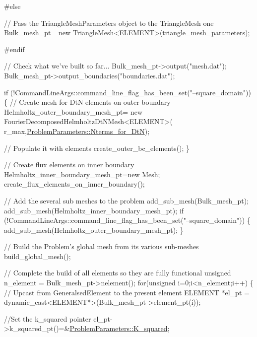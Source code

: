 \begin{DoxyCodeInclude}
\textcolor{preprocessor}{#else}

 \textcolor{comment}{// Pass the TriangleMeshParameters object to the TriangleMesh one}
 Bulk\_mesh\_pt= \textcolor{keyword}{new} TriangleMesh<ELEMENT>(triangle\_mesh\_parameters);

\textcolor{preprocessor}{#endif}

 \textcolor{comment}{// Check what we've built so far...}
 Bulk\_mesh\_pt->output(\textcolor{stringliteral}{"mesh.dat"});
 Bulk\_mesh\_pt->output\_boundaries(\textcolor{stringliteral}{"boundaries.dat"});
 

 \textcolor{keywordflow}{if} (!CommandLineArgs::command\_line\_flag\_has\_been\_set(\textcolor{stringliteral}{"--square\_domain"}))
  \{
   \textcolor{comment}{// Create mesh for DtN elements on outer boundary}
   Helmholtz\_outer\_boundary\_mesh\_pt=
    \textcolor{keyword}{new} FourierDecomposedHelmholtzDtNMesh<ELEMENT>(
     r\_max,\hyperlink{namespaceProblemParameters_aa529b33b7feb959e0c044447bf0f6c6f}{ProblemParameters::Nterms\_for\_DtN});
   
   \textcolor{comment}{// Populate it with elements}
   create\_outer\_bc\_elements();
  \}

 \textcolor{comment}{// Create flux elements on inner boundary}
 Helmholtz\_inner\_boundary\_mesh\_pt=\textcolor{keyword}{new} Mesh;
 create\_flux\_elements\_on\_inner\_boundary();
 
 \textcolor{comment}{// Add the several sub meshes to the problem}
 add\_sub\_mesh(Bulk\_mesh\_pt); 
 add\_sub\_mesh(Helmholtz\_inner\_boundary\_mesh\_pt); 
 \textcolor{keywordflow}{if} (!CommandLineArgs::command\_line\_flag\_has\_been\_set(\textcolor{stringliteral}{"--square\_domain"}))
  \{
   add\_sub\_mesh(Helmholtz\_outer\_boundary\_mesh\_pt); 
  \}

 \textcolor{comment}{// Build the Problem's global mesh from its various sub-meshes}
 build\_global\_mesh();

 \textcolor{comment}{// Complete the build of all elements so they are fully functional}
 \textcolor{keywordtype}{unsigned} n\_element = Bulk\_mesh\_pt->nelement();
 \textcolor{keywordflow}{for}(\textcolor{keywordtype}{unsigned} i=0;i<n\_element;i++)
  \{
   \textcolor{comment}{// Upcast from GeneralsedElement to the present element}
   ELEMENT *el\_pt = \textcolor{keyword}{dynamic\_cast<}ELEMENT*\textcolor{keyword}{>}(Bulk\_mesh\_pt->element\_pt(i));
   
   \textcolor{comment}{//Set the k\_squared pointer}
   el\_pt->k\_squared\_pt()=&\hyperlink{namespaceProblemParameters_aa5362de1af9e257fde4317c367158a93}{ProblemParameters::K\_squared};
   

\end{DoxyCodeInclude}

